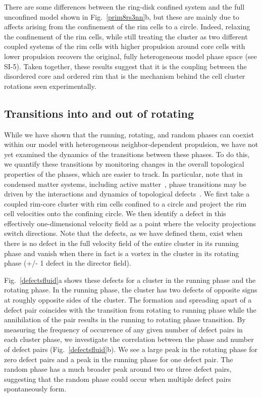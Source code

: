\documentclass{article}
\begin{document}
There are some differences between the ring-disk confined system and the full unconfined model shown in Fig.~\ref{prim8rs3nn}b, but these are mainly due to affects arising from the confinement of the rim cells to a circle.  Indeed, relaxing the confinement of the rim cells, while still treating the cluster as two different coupled systems of the rim cells with higher propulsion around core cells with lower propulsion recovers the original, fully heterogeneous model phase space (see SI-5).  Taken together, these results suggest that it is the coupling between the disordered core and ordered rim that is the mechanism behind the cell cluster rotations seen experimentally.

\subsection*{Transitions into and out of rotating}
While we have shown that the running, rotating, and random phases can coexist within our model with heterogeneous neighbor-dependent propulsion, we have not yet examined the dynamics of the transitions between these phases. To do this, we quantify these transitions by monitoring changes in the overall topological properties of the phases, which are easier to track. In particular, note that in condensed matter systems, including active matter~\cite{Weber2014,Giomi2013}, phase transitions may be driven by the interactions and dynamics of topological defects~\cite{Duclos2014}. We first take a coupled rim-core cluster with rim cells confined to a circle and project the rim cell velocities onto the confining circle. We then identify a defect in this effectively one-dimensional velocity field as a point where the velocity projections switch directions. Note that the defects, as we have defined them, exist when there is no defect in the full velocity field of the entire cluster in its running phase and vanish when there in fact is a vortex in the cluster in its rotating phase (+/- 1 defect in the director field). 

Fig.~\ref{defectsfluid}a shows these defects for a cluster in the running phase and the rotating phase. In the running phase, the cluster has two defects of opposite signs at roughly opposite sides of the cluster. The formation and spreading apart of a defect pair coincides with the transition from rotating to running phase while the annihilation of the pair results in the running to rotating phase transition. By measuring the frequency of occurrence of any given number of defect pairs in each cluster phase, we investigate the correlation between the phase and number of defect pairs (Fig.~\ref{defectsfluid}b).  We see a large peak in the rotating phase for zero defect pairs and a peak in the running phase for one defect pair.  The random phase has a much broader peak around two or three defect pairs, suggesting that the random phase could occur when multiple defect pairs spontaneously form.
\end{document}
